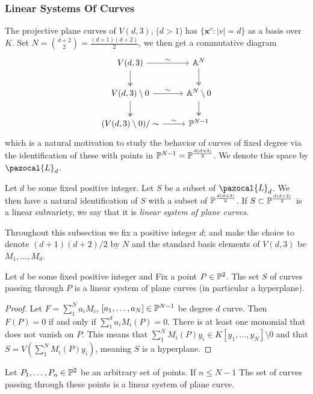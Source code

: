 \subsubsection{Linear Systems Of Curves}
    The projective plane curves of $V(d,3)$, ($d>1$) has $\{\mathbf{x}^v : \vert v \vert = d\}$ as a basis over $K$. Set $N = {d+ 2 \choose 2} =\frac{(d+1)(d+2)}{2}$, we then get a commutative diagram
    $$\begin{tikzcd}
        V(d,3) \arrow[r, "\sim"] \arrow[d,twoheadrightarrow] & \A^N\arrow[d,twoheadrightarrow]\\
        V(d,3)\setminus 0 \arrow[r,"\sim"] \arrow[d,twoheadrightarrow]  & \A^N\setminus 0 \arrow[d,twoheadrightarrow]\\
        (V(d,3)\setminus 0)/\sim \arrow[r, "\sim"] & \Pp^{N-1}  
    \end{tikzcd}$$
    which is a natural motivation to study the behavior of curves of fixed degree via the identification of these with points in $\mathbb{P}^{N-1}=\mathbb{P}^{\frac{d(d+3)}{2}}$. We denote this space by $\pazocal{L}_d$.
    \begin{definition}
        Let $d$ be some fixed positive integer. Let $S$ be a subset of $\pazocal{L}_d$. We then have a natural identification of $S$ with a subset of $\mathbb{P} ^{\frac{d(d+3)}{2}}$. If $S\subset \mathbb{P} ^{\frac{d(d+3)}{2}}$ is a linear subvariety, we say that it is \textit{linear system of plane curves}.
    \end{definition}
    \begin{remark}
        Throughout this subsection we fix a positive integer $d$; and make the choice to denote $(d+1)(d+2)/2$ by $N$ and the standard basis elements of $V(d,3)$ be $M_1,\dots,M_d$.
    \end{remark}
    \begin{proposition}
        Let $d$ be some fixed positive integer and Fix a point $P\in \mathbb{P}^2$. The set $S$ of curves passing through $P$ is a linear system of plane curves (in particular a hyperplane). 
    \end{proposition}
    \begin{proof}
        Let $F=\sum_1^N a_i M_i$, $[a_1,\dots,a_N]\in \mathbb{P}^{N-1}$ be degree $d$ curve. Then $F(P)=0$ if and only if $\sum_1^d a_i M_i(P)=0$. There is at least one monomial that does not vanish on $P$. This means that $\sum_1^N M_i(P)y_i\in K[y_1,\dots,y_N]\setminus 0$ and that $S=V(\sum_1^N M_i(P)y_i)$, meaning $S$ is a hyperplane.
    \end{proof}
    \begin{corollary}
        Let $P_1,\dots,P_n\in \mathbb{P}^2$ be an arbitrary set of points. If $n\leq N-1$ The set of curves passing through these points is a linear system of plane curve.
    \end{corollary}
